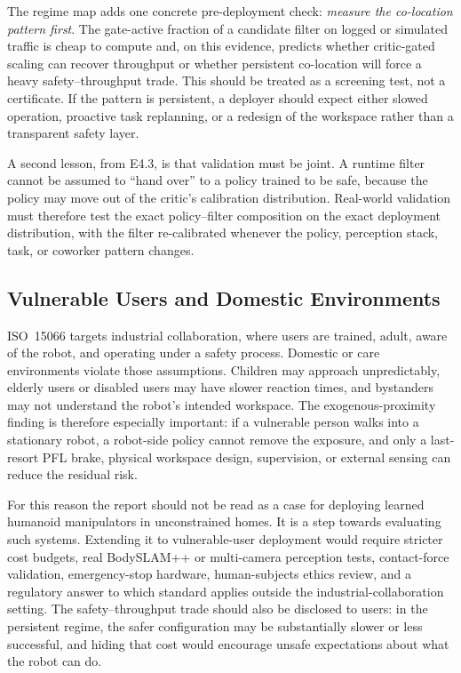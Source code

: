 \documentclass[11pt,a4paper]{report}
\newcommand{\pfl}{PFL}
\newcommand{\iso}{ISO~15066}
\begin{document}
The regime map adds one concrete pre-deployment check: \emph{measure
the co-location pattern first}. The gate-active fraction of a candidate
filter on logged or simulated traffic is cheap to compute and, on this
evidence, predicts whether critic-gated scaling can recover throughput
or whether persistent co-location will force a heavy safety--throughput
trade. This should be treated as a screening test, not a certificate.
If the pattern is persistent, a deployer should expect either slowed
operation, proactive task replanning, or a redesign of the workspace
rather than a transparent safety layer.

A second lesson, from E4.3, is that validation must be joint. A runtime
filter cannot be assumed to ``hand over'' to a policy trained to be
safe, because the policy may move out of the critic's calibration
distribution. Real-world validation must therefore test the exact
policy--filter composition on the exact deployment distribution, with
the filter re-calibrated whenever the policy, perception stack, task,
or coworker pattern changes.

\subsection{Vulnerable Users and Domestic Environments}

\iso{} targets industrial collaboration, where users are trained,
adult, aware of the robot, and operating under a safety process.
Domestic or care environments violate those assumptions. Children may
approach unpredictably, elderly users or disabled users may have slower
reaction times, and bystanders may not understand the robot's intended
workspace. The exogenous-proximity finding is therefore especially
important: if a vulnerable person walks into a stationary robot, a
robot-side policy cannot remove the exposure, and only a last-resort
\pfl{} brake, physical workspace design, supervision, or external
sensing can reduce the residual risk.

For this reason the report should not be read as a case for deploying
learned humanoid manipulators in unconstrained homes. It is a step
towards evaluating such systems. Extending it to vulnerable-user
deployment would require stricter cost budgets, real BodySLAM++ or
multi-camera perception tests, contact-force validation, emergency-stop
hardware, human-subjects ethics review, and a regulatory answer to
which standard applies outside the industrial-collaboration setting.
The safety--throughput trade should also be disclosed to users: in the
persistent regime, the safer configuration may be substantially slower
or less successful, and hiding that cost would encourage unsafe
expectations about what the robot can do.
\end{document}
